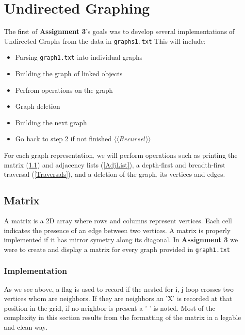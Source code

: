 \documentclass[12pt, letterpaper]{article}
\begin{document}
\section{Undirected Graphing} \label{Graph}
The first of \textbf{Assignment 3}'s goals was to develop several implementations of Undirected Graphs from the data in \texttt{graphs1.txt}
\vspace*{5pt}
\newline
This will include:
\begin{itemize}
   \item Parsing \texttt{graph1.txt} into individual graphs
   \item Building the graph of linked objects
   \item Perfrom operations on the graph
   \item Graph deletion
   \item Building the next graph
   \item Go back to step 2 if not finished $\langle \langle Recurse! \rangle \rangle$
\end{itemize}
For each graph representation, we will perform operations such as printing the matrix (\ref{Matrix}) and adjacency lists (\ref{AdjList}), a depth-first and breadth-first traversal (\ref{Traversals}), and a deletion of the graph, its vertices and edges.

\subsection{Matrix} \label{Matrix}
A matrix is a 2D array where rows and columns represent vertices.
Each cell indicates the presence of an edge between two vertices.
A matrix is properly implemented if it has mirror symetry along its diagonal.
In \textbf{Assignment 3} we were to create and display a matrix for every graph provided in \texttt{graph1.txt}
\subsubsection{Implementation}
\begin{center}
   
\end{center}
As we see above, a flag is used to record if the nested for i, j loop crosses two vertices whom are neighbors.
If they are neighbors an 'X' is recorded at that position in the grid, if no neighbor is present a '-' is noted.
Most of the complexity in this section results from the formatting of the matrix in a legable and clean way.
\end{document}
